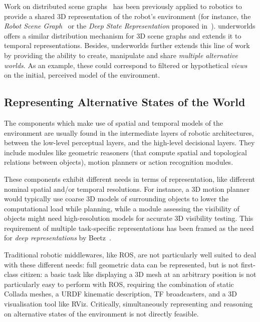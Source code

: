 \documentclass[letterpaper, 10pt, conference]{ieeeconf}
\newcommand{\eg}{e.g.,\xspace}
\newcommand{\uwds}{{\sc underworlds}\xspace}
\begin{document}
Work on distributed scene graphs~\cite{naef2003blue} has been previously applied
to robotics to provide a shared 3D representation of the robot's environment
(for instance, the \emph{Robot Scene Graph}~\cite{blumenthal2013scene} or the
\emph{Deep State Representation} proposed in~\cite{bustos2016unified}).  \uwds
offers a similar distribution mechanism for 3D scene graphs and extends it to
temporal representations. Besides, \uwds further extends this line of work by
providing the ability to create, manipulate and share \emph{multiple alternative
worlds}. As an example, these could correspond to filtered or hypothetical
\emph{views} on the initial, perceived model of the environment.

\subsection{Representing Alternative States of the World}\label{alter}

The components which make use of spatial and temporal models of the environment
are usually found in the intermediate layers of robotic architectures, between
the low-level perceptual layers, and the high-level decisional layers. They
include modules like geometric reasoners (that compute spatial and topological
relations between objects), motion planners or action recognition modules.

These components exhibit different needs in terms of representation,
like different nominal spatial and/or temporal resolutions. For instance, a 3D
motion planner would typically use coarse 3D models of surrounding objects to
lower the computational load while planning, while a module assessing the
visibility of objects might need high-resolution models 
for accurate 3D visibility testing. This requirement of multiple
task-specific representations has been framed as the need for \emph{deep
representations} by Beetz~\cite{beetz2010towards}.


Traditional robotic middlewares, like ROS, are not particularly well suited to
deal with these different needs: full geometric data can be represented, but is
not first-class citizen: a basic task like displaying a 3D mesh at an arbitrary
position is not particularly easy to perform with ROS, requiring the combination
of static Collada meshes, a URDF kinematic description, TF broadcasters, and a
3D visualisation tool like RViz. Critically, simultaneously representing and
reasoning on alternative states of the environment is not directly feasible.
\end{document}
